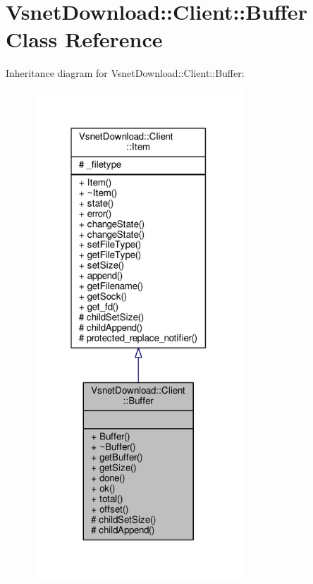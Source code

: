 \hypertarget{classVsnetDownload_1_1Client_1_1Buffer}{}\section{Vsnet\+Download\+:\+:Client\+:\+:Buffer Class Reference}
\label{classVsnetDownload_1_1Client_1_1Buffer}


Inheritance diagram for Vsnet\+Download\+:\+:Client\+:\+:Buffer\+:
\nopagebreak
\begin{figure}[H]
\begin{center}
\leavevmode
\includegraphics[width=223pt]{d9/d50/classVsnetDownload_1_1Client_1_1Buffer__inherit__graph}
\end{center}
\end{figure}


